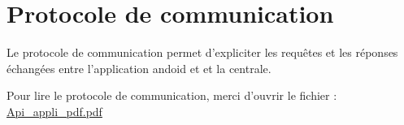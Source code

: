 \documentclass[11pt,a4paper]{report} %
\begin{document}
		
		
		
		\section{Protocole de communication}
Le protocole de communication permet d'expliciter les requêtes et les réponses échangées entre l'application andoid et et la centrale.

Pour lire le protocole de communication, merci d'ouvrir le fichier : \href{run:./Picture/Api_appli_pdf.pdf}{Api\_appli\_pdf.pdf}
		
\tableofcontents
\listoffigures
\listoftables
		
\end{document}
